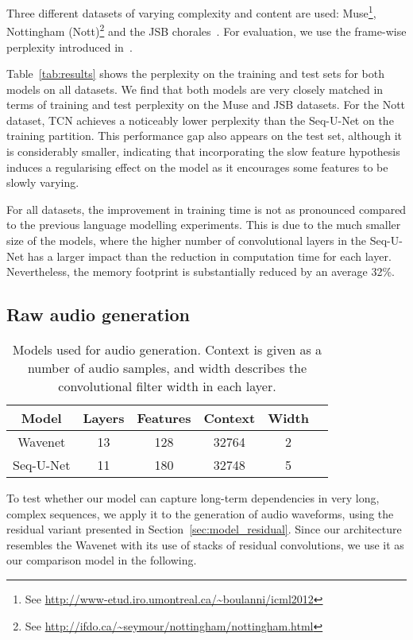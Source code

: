 \documentclass{article}
\begin{document}
Three different datasets of varying complexity and content are used: Muse\footnote{See \url{http://www-etud.iro.umontreal.ca/~boulanni/icml2012}}, Nottingham (Nott)\footnote{See \url{http://ifdo.ca/~seymour/nottingham/nottingham.html}} and the JSB chorales~\cite{allanHarmonisingChorales2005}.
For evaluation, we use the frame-wise perplexity introduced in~\cite{boulanger-lewandowskiModelingTemporal2012}.

Table~\ref{tab:results} shows the perplexity on the training and test sets for both models on all datasets.
We find that both models are very closely matched in terms of training and test perplexity on the Muse and JSB datasets.
For the Nott dataset, TCN achieves a noticeably lower perplexity than the Seq-U-Net on the training partition.
This performance gap also appears on the test set, although it is considerably smaller, indicating that incorporating the slow feature hypothesis induces a regularising effect on the model as it encourages some features to be slowly varying.

For all datasets, the improvement in training time is not as pronounced compared to the previous language modelling experiments.
This is due to the much smaller size of the models, where the higher number of convolutional layers in the Seq-U-Net has a larger impact than the reduction in computation time for each layer.
Nevertheless, the memory footprint is substantially reduced by an average 32\%.

\subsection{Raw audio generation}
\label{sec:experiments_audio}

\begin{table}[t]
\centering
\begin{tabular}{cccccc}
\toprule
Model & Layers & Features & Context & Width \\
\midrule
Wavenet & 13 & 128 & 32764 & 2 \\
Seq-U-Net & 11 & 180 & 32748 & 5 \\
\bottomrule
\end{tabular}
\caption{Models used for audio generation. Context is given as a number of audio samples, and width describes the convolutional filter width in each layer.}
\label{tab:audio}
\end{table}

To test whether our model can capture long-term dependencies in very long, complex sequences, we apply it to the generation of audio waveforms, using the residual variant presented in Section~\ref{sec:model_residual}.
Since our architecture resembles the Wavenet with its use of stacks of residual convolutions, we use it as our comparison model in the following.
\end{document}
